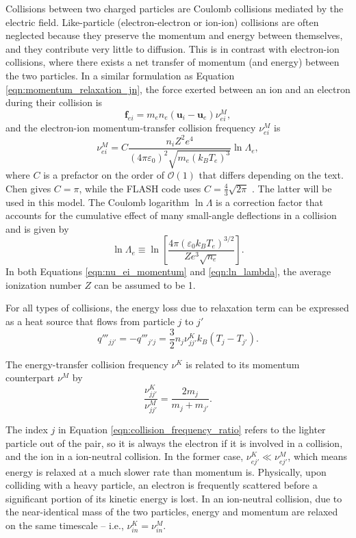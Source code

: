 Collisions between two charged particles are Coulomb collisions mediated by the electric field. Like-particle (electron-electron or ion-ion) collisions are often neglected because they preserve the momentum and
energy between themselves, and they contribute very little to diffusion. This is in contrast with electron-ion collisions, where there exists a net transfer of momentum (and energy) between the two particles. In a
similar formulation as Equation \ref{eqn:momentum_relaxation_jn}, the force exerted between an ion and an electron during their collision is
\begin{equation}
    \mathbf{f}_{ei} = m_e n_e (\mathbf{u}_i - \mathbf{u}_e) \nu^M_{ei},
    \label{eqn:momentum_relaxation_ei}
\end{equation}
and the electron-ion momentum-transfer collision frequency $\nu^M_{ei}$ is
\begin{equation}
    \nu^M_{ei} = C \frac{n_i Z^2 e^4}{(4\pi\varepsilon_0)^2 \sqrt{m_e (k_B T_e)^3}} \ln\Lambda_e,
    \label{eqn:nu_ei_momentum}
\end{equation}
where $C$ is a prefactor on the order of $\mathcal{O}(1)$ that differs depending on the text. Chen gives $C = \pi$, while the FLASH code uses $C = \frac{4}{3} \sqrt{2\pi}$ \cite{Chen}\cite{FLASH}. The latter will be
used in this model. The Coulomb logarithm $\ln\Lambda$ is a correction factor that accounts for the cumulative effect of many small-angle deflections in a collision and is given by
\begin{equation}
    \ln\Lambda_e \equiv \ln \left[ \frac{4\pi (\varepsilon_0 k_B T_e)^{3/2}}{Ze^3 \sqrt{n_e}} \right].
    \label{eqn:ln_lambda}
\end{equation}
In both Equations \ref{eqn:nu_ei_momentum} and \ref{eqn:ln_lambda}, the average ionization number $Z$ can be assumed to be 1.

For all types of collisions, the energy loss due to relaxation term can be expressed as a heat source that flows from particle $j$ to $j'$
\begin{equation}
    q'''_{jj'} = -q'''_{j'j} = \frac{3}{2} n_j \nu_{jj'}^K k_B (T_j - T_{j'}).
    \label{eqn:energy_relaxation}
\end{equation}

The energy-transfer collision frequency $\nu^K$ is related to its momentum counterpart $\nu^M$ by
\begin{equation}
    \frac{\nu_{jj'}^K}{\nu_{jj'}^M} = \frac{2m_j}{m_j + m_{j'}}.
    \label{eqn:collision_frequency_ratio}
\end{equation}

The index $j$ in Equation \ref{eqn:collision_frequency_ratio} refers to the lighter particle out of the pair, so it is always the electron if it is involved in a collision, and the ion in a ion-neutral collision.
In the former case, $\nu_{ej'}^K \ll \nu_{ej'}^M$, which means energy is relaxed at a much slower rate than momentum is. Physically, upon colliding with a heavy particle, an electron is frequently scattered before
a significant portion of its kinetic energy is lost. In an ion-neutral collision, due to the near-identical mass of the two particles, energy and momentum are relaxed on the same timescale -- i.e., $\nu_{in}^K = \nu_{in}^M$.